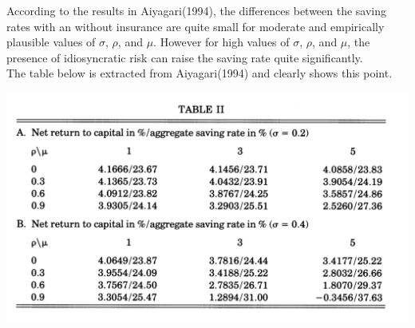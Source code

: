 \documentclass[../main.tex]{subfiles}
\title{}
\author{}
\begin{document}
\maketitle
According to the results in Aiyagari(1994), the differences between the saving rates with an without insurance are quite small for moderate and empirically plausible values of $\sigma$, $\rho$, and $\mu$. However for high values of $\sigma$, $\rho$, and $\mu$, the presence of idiosyncratic risk can raise the saving rate quite significantly. \\

The table below is extracted from Aiyagari(1994) and clearly shows this point. 

\centering
\includegraphics[scale=0.5]{../Appendix/Table-Aiyagari.png}
\end{document}
